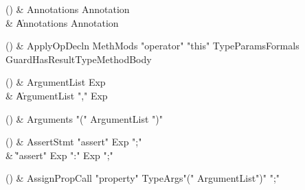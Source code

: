 \begin{bbgrammarappendix}

() & Annotations \label{prod:Annotations}  \: Annotation  \\

 &    \| Annotations Annotation \\

\end{bbgrammarappendix}

\begin{bbgrammarappendix}

() & ApplyOpDecln \label{prod:ApplyOpDecln}  \: MethMods \xcd"operator" \xcd"this" TypeParams\opt Formals Guard\opt HasResultType\opt MethodBody  \\


\end{bbgrammarappendix}

\begin{bbgrammarappendix}

() & ArgumentList \label{prod:ArgumentList}  \: Exp  \\

 &    \| ArgumentList \xcd"," Exp \\

\end{bbgrammarappendix}

\begin{bbgrammarappendix}

() & Arguments \label{prod:Arguments}  \: \xcd"(" ArgumentList \xcd")"  \\


\end{bbgrammarappendix}

\begin{bbgrammarappendix}

() & AssertStmt \label{prod:AssertStmt}  \: \xcd"assert" Exp \xcd";"  \\

 &    \| \xcd"assert" Exp  \xcd":" Exp  \xcd";" \\

\end{bbgrammarappendix}

\begin{bbgrammarappendix}

() & AssignPropCall \label{prod:AssignPropCall}  \: \xcd"property" TypeArgs\opt \xcd"(" ArgumentList\opt \xcd")" \xcd";"  \\


\end{bbgrammarappendix}


